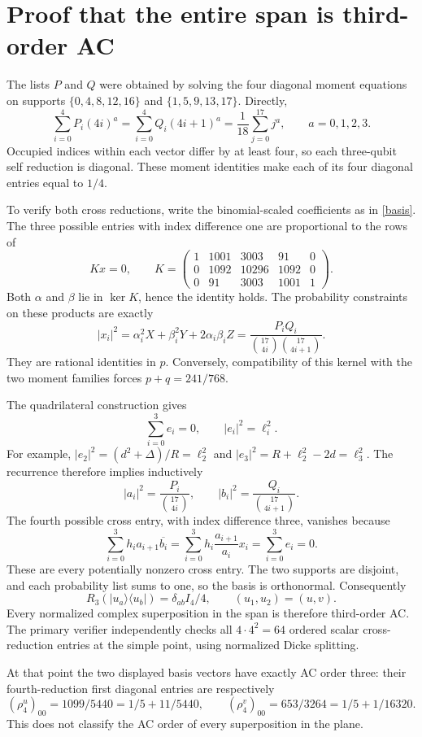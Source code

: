 \documentclass[11pt]{article}
\begin{document}
\section{Proof that the entire span is third-order AC}
The lists $P$ and $Q$ were obtained by solving the four diagonal moment
equations on supports $\{0,4,8,12,16\}$ and $\{1,5,9,13,17\}$. Directly,
\[
\sum_{i=0}^4P_i(4i)^a=\sum_{i=0}^4Q_i(4i+1)^a
=\frac1{18}\sum_{j=0}^{17}j^a,\qquad a=0,1,2,3.
\]
Occupied indices within each vector differ by at least four, so each
three-qubit self reduction is diagonal. These moment identities make
each of its four diagonal entries equal to $1/4$.

To verify both cross reductions, write the binomial-scaled coefficients
as in \eqref{basis}. The three possible entries with index difference one
are proportional to the rows of
\[
Kx=0,\qquad
K=\begin{pmatrix}
1&1001&3003&91&0\\
0&1092&10296&1092&0\\
0&91&3003&1001&1
\end{pmatrix}.
\]
Both $\alpha$ and $\beta$ lie in $\ker K$, hence the identity holds.
The probability constraints on these products are exactly
\[
|x_i|^2=\alpha_i^2X+\beta_i^2Y+2\alpha_i\beta_iZ
=\frac{P_iQ_i}{\binom{17}{4i}\binom{17}{4i+1}}.
\]
They are rational identities in $p$. Conversely, compatibility of this
kernel with the two moment families forces $p+q=241/768$.

The quadrilateral construction gives
\[
\sum_{i=0}^3e_i=0,\qquad |e_i|^2=\ell_i^2.
\]
For example, $|e_2|^2=(d^2+\Delta)/R=\ell_2^2$ and
$|e_3|^2=R+\ell_2^2-2d=\ell_3^2$.
The recurrence therefore implies inductively
\[
|a_i|^2=\frac{P_i}{\binom{17}{4i}},\qquad
|b_i|^2=\frac{Q_i}{\binom{17}{4i+1}}.
\]
The fourth possible cross entry, with index difference three, vanishes because
\[
\sum_{i=0}^3 h_i a_{i+1}\overline{b_i}
=\sum_{i=0}^3h_i\frac{a_{i+1}}{a_i}x_i
=\sum_{i=0}^3e_i=0.
\]
These are every potentially nonzero cross entry. The two supports are disjoint,
and each probability list sums to one, so the basis is orthonormal. Consequently
\[
\boxed{R_3(|u_a\rangle\langle u_b|)=\delta_{ab}I_4/4,
\qquad (u_1,u_2)=(u,v).}
\]
Every normalized complex superposition in the span is therefore third-order AC.
The primary verifier independently checks all $4\cdot4^2=64$ ordered scalar
cross-reduction entries at the simple point, using normalized Dicke splitting.

At that point the two displayed basis vectors have exactly AC order three:
their fourth-reduction first diagonal entries are respectively
\[
(\rho_4^u)_{00}=1099/5440=1/5+11/5440,\qquad
(\rho_4^v)_{00}=653/3264=1/5+1/16320.
\]
This does not classify the AC order of every superposition in the plane.
\end{document}
